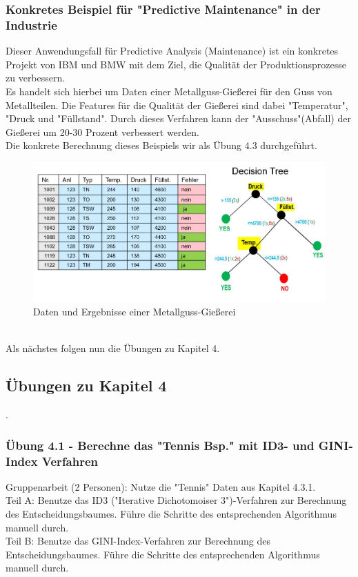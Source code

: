 \documentclass[12pt]{article}
\begin{document}
\subsubsection{Konkretes Beispiel für "Predictive Maintenance" in der Industrie}
Dieser Anwendungsfall für Predictive Analysis (Maintenance) ist ein konkretes Projekt von IBM und BMW mit dem Ziel, die Qualität der Produktionsprozesse zu verbessern.\\
Es handelt sich hierbei um Daten einer Metallguss-Gießerei für den Guss von Metallteilen. Die Features für die Qualität der Gießerei sind dabei "Temperatur", "Druck und "Füllstand". Durch dieses Verfahren kann der "Ausschuss"(Abfall) der Gießerei um 20-30 Prozent verbessert werden.\\
Die konkrete Berechnung dieses Beispiels wir als Übung 4.3 durchgeführt.\\[0.2cm]
\begin{figure}[htp]
  \hspace*{-0.5cm} 
  \includegraphics[width=1.15\textwidth]{PredMaint-Metallguss}
  \caption{Daten und Ergebnisse einer Metallguss-Gießerei}
  \label{fig:PredMaint-Metallguss}
\end{figure}
\\[8.8cm]
Als nächstes folgen nun die Übungen zu Kapitel 4.\\

\newpage

\subsection{Übungen zu Kapitel 4}
%
.\\
\subsubsection{Übung 4.1 - Berechne das "Tennis Bsp." mit ID3- und GINI-Index Verfahren}
Gruppenarbeit (2 Personen): Nutze die "Tennis" Daten aus Kapitel 4.3.1.\\
Teil A: Benutze das ID3 ("Iterative Dichotomoiser 3")-Verfahren zur Berechnung des Entscheidungsbaumes. Führe die Schritte des entsprechenden Algorithmus manuell durch.\\[0.2cm]
Teil B: Benutze das GINI-Index-Verfahren zur Berechnung des Entscheidungsbaumes. Führe die Schritte des entsprechenden Algorithmus manuell durch.\\[0.2cm]
%
\end{document}
